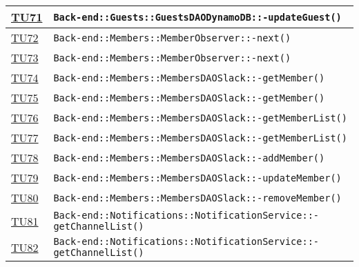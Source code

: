 \begin{longtable}{|>{\centering}m{1cm}|m{12cm}<{\centering}|}
\hyperlink{TU71}{TU71} & \texttt{Back-end::Guests::GuestsDAODynamoDB::-\linebreak updateGuest()}\\ \hline

\hyperlink{TU72}{TU72} & \texttt{Back-end::Members::MemberObserver::-\linebreak next()}\\ \hline

\hyperlink{TU73}{TU73} & \texttt{Back-end::Members::MemberObserver::-\linebreak next()}\\ \hline

\hyperlink{TU74}{TU74} & \texttt{Back-end::Members::MembersDAOSlack::-\linebreak getMember()}\\ \hline

\hyperlink{TU75}{TU75} & \texttt{Back-end::Members::MembersDAOSlack::-\linebreak getMember()}\\ \hline

\hyperlink{TU76}{TU76} & \texttt{Back-end::Members::MembersDAOSlack::-\linebreak getMemberList()}\\ \hline

\hyperlink{TU77}{TU77} & \texttt{Back-end::Members::MembersDAOSlack::-\linebreak getMemberList()}\\ \hline

\hyperlink{TU78}{TU78} & \texttt{Back-end::Members::MembersDAOSlack::-\linebreak addMember()}\\ \hline

\hyperlink{TU79}{TU79} & \texttt{Back-end::Members::MembersDAOSlack::-\linebreak updateMember()}\\ \hline

\hyperlink{TU80}{TU80} & \texttt{Back-end::Members::MembersDAOSlack::-\linebreak removeMember()}\\ \hline

\hyperlink{TU81}{TU81} & \texttt{Back-end::Notifications::NotificationService::-\linebreak getChannelList()}\\ \hline

\hyperlink{TU82}{TU82} & \texttt{Back-end::Notifications::NotificationService::-\linebreak getChannelList()}\\ \hline


\end{longtable}

